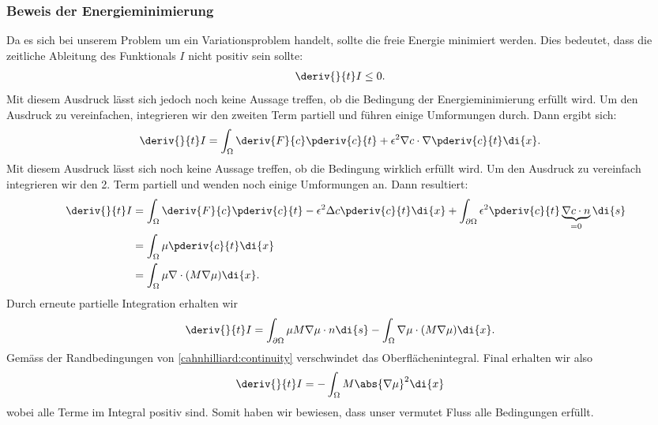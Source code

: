 \subsubsection{Beweis der Energieminimierung}
Da es sich bei unserem Problem um ein Variationsproblem handelt,
sollte die freie Energie minimiert werden.
Dies bedeutet, dass die zeitliche Ableitung des Funktionals  $I$
nicht positiv sein sollte:
\begin{align*}
\deriv{}{t} I
&\leq
0
.
\end{align*}
Mit diesem Ausdruck lässt sich jedoch noch keine Aussage treffen,
ob die Bedingung der Energieminimierung erfüllt wird.
Um den Ausdruck zu vereinfachen,
integrieren wir den zweiten Term partiell und führen einige Umformungen durch.
Dann ergibt sich:
\begin{align*}
\deriv{}{t} I
&=
\int_\Omega \deriv{F}{c} \pderiv{c}{t} + \epsilon^2 \nabla c \cdot \nabla \pderiv{c}{t} \di{x}
.
\end{align*}
Mit diesem Ausdruck lässt sich noch keine Aussage treffen,
ob die Bedingung wirklich erfüllt wird.
Um den Ausdruck zu vereinfach integrieren wir den 2. Term partiell und wenden noch einige Umformungen an.
Dann resultiert:
\begin{align*}
\deriv{}{t} I
&=
\int_\Omega \deriv{F}{c} \pderiv{c}{t} - \epsilon^2 \Delta c \pderiv{c}{t} \di{x}
+ \int_{\partial\Omega} \epsilon^2 \pderiv{c}{t} \underbrace{\nabla c\cdot n}_{=0} \di{s}
\\
&=
\int_\Omega \mu \pderiv{c}{t} \di{x}
\\
&=
\int_\Omega \mu \nabla \cdot (M \nabla \mu) \di{x}
.
\end{align*}
Durch erneute partielle Integration erhalten wir
\begin{align*}
\deriv{}{t} I
&=
\int_{\partial\Omega} \mu M \nabla \mu \cdot n \di{s} - \int_\Omega \nabla \mu \cdot (M \nabla \mu) \di{x}
.
\end{align*}
Gemäss der Randbedingungen von \eqref{cahnhilliard:continuity}
verschwindet das Oberflächenintegral.
Final erhalten wir also
\begin{align*}
\deriv{}{t} I
&=
-\int_\Omega M \abs{\nabla \mu}^2 \di{x}
\end{align*}
wobei alle Terme im Integral positiv sind.
Somit haben wir bewiesen,
dass unser vermutet Fluss alle Bedingungen erfüllt.

